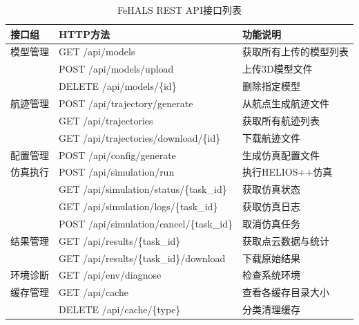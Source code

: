 \documentclass[a4paper,fleqn]{cas-sc}
\begin{document}
\begin{table}[pos=!htbp]
    \centering
    \caption{FeHALS REST API接口列表}
    \label{tab:api-interfaces}
    \begin{tabular}{@{} lll @{}}
        \toprule
        \textbf{接口组} & \textbf{HTTP方法}                          & \textbf{功能说明} \\
        \midrule
        模型管理         & GET /api/models                          & 获取所有上传的模型列表   \\
                     & POST /api/models/upload                  & 上传3D模型文件      \\
                     & DELETE /api/models/\{id\}                & 删除指定模型        \\
        航迹管理         & POST /api/trajectory/generate            & 从航点生成航迹文件     \\
                     & GET /api/trajectories                    & 获取所有航迹列表      \\
                     & GET /api/trajectories/download/\{id\}    & 下载航迹文件        \\
        配置管理         & POST /api/config/generate                & 生成仿真配置文件      \\
        仿真执行         & POST /api/simulation/run                 & 执行HELIOS++仿真  \\
                     & GET /api/simulation/status/\{task\_id\}  & 获取仿真状态        \\
                     & GET /api/simulation/logs/\{task\_id\}    & 获取仿真日志        \\
                     & POST /api/simulation/cancel/\{task\_id\} & 取消仿真任务        \\
        结果管理         & GET /api/results/\{task\_id\}            & 获取点云数据与统计     \\
                     & GET /api/results/\{task\_id\}/download   & 下载原始结果        \\
        环境诊断         & GET /api/env/diagnose                    & 检查系统环境        \\
        缓存管理         & GET /api/cache                           & 查看各缓存目录大小     \\
                     & DELETE /api/cache/\{type\}               & 分类清理缓存        \\
        \bottomrule
    \end{tabular}
\end{table}
\end{document}
